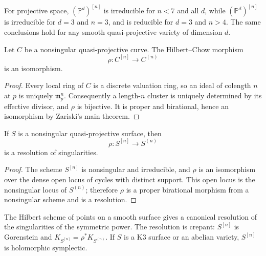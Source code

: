 \begin{remark}\label{fga-rem-7-2-9}\uses{}
For projective space, $(\mathbb P^d)^{[n]}$ is irreducible for $n<7$ and all
$d$, while $(\mathbb P^d)^{[n]}$ is irreducible for $d=3$ and $n=3$, and is
reducible for $d=3$ and $n>4$.  The same conclusions hold for any smooth
quasi-projective variety of dimension $d$.
\end{remark}

\begin{proposition}\label{fga-pro-7-3-3}\uses{}
Let $C$ be a nonsingular quasi-projective curve.  The Hilbert--Chow morphism
\[
\rho:C^{[n]}\longrightarrow C^{(n)}
\]
is an isomorphism.
\end{proposition}
\begin{proof}
Every local ring of $C$ is a discrete valuation ring, so an ideal of colength
$n$ at $p$ is uniquely $\mathfrak m_p^n$.  Consequently a length-$n$ cluster is
uniquely determined by its effective divisor, and $\rho$ is bijective.  It is
proper and birational, hence an isomorphism by Zariski's main theorem.
\end{proof}

\begin{theorem}[Fogarty]\label{fga-the-7-3-4}
If $S$ is a nonsingular quasi-projective surface, then
\[
\rho:S^{[n]}\longrightarrow S^{(n)}
\]
is a resolution of singularities.
\end{theorem}
\begin{proof}
The scheme $S^{[n]}$ is nonsingular and irreducible, and $\rho$ is an
isomorphism over the dense open locus of cycles with distinct support.  This
open locus is the nonsingular locus of $S^{(n)}$; therefore $\rho$ is a proper
birational morphism from a nonsingular scheme and is a resolution.
\end{proof}

\begin{remark}\label{fga-rem-7-3-5}
The Hilbert scheme of points on a smooth surface gives a canonical resolution of
the singularities of the symmetric power.  The resolution is crepant:
$S^{[n]}$ is Gorenstein and $K_{S^{[n]}}=\rho^*K_{S^{(n)}}$.  If $S$ is a K3
surface or an abelian variety, $S^{[n]}$ is holomorphic symplectic.
\end{remark}

